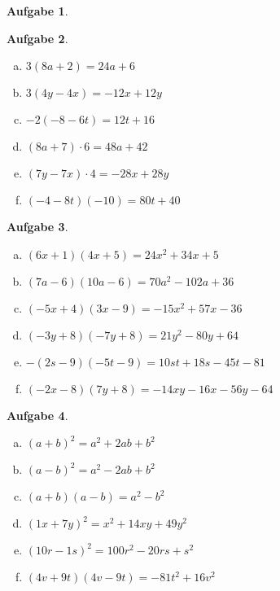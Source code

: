 \documentclass[12pt,fleqn]{article}
\theoremstyle{aufg}
\newtheorem{aufgabe}{Aufgabe}
\theoremstyle{bsp}
\begin{document}
\begin{flushleft}
\begin{aufgabe}
\begin{multicols}{2}
\begin{enumerate}[a)]
\end{enumerate} 
\end{multicols} 
\end{aufgabe} 
\begin{aufgabe} ~ \\ 
\begin{multicols}{3} 
\begin{enumerate}[a)] 
\item 
$3(8a+2)=24 a + 6$
\item 
$3(4y-4x)=- 12 x + 12 y$
\item 
$-2(-8-6t)=12 t + 16$
\item 
$(8a+7)\cdot 6=48 a + 42$
\item 
$(7y-7x)\cdot 4=- 28 x + 28 y$
\item 
$(-4-8t)(-10)=80 t + 40$
\end{enumerate} 
\end{multicols} 
\end{aufgabe} 
\begin{aufgabe} ~ \\ 
\begin{multicols}{3} 
\begin{enumerate}[a)] 
\item 
$(6x+1)(4x+5)=24 x^{2} + 34 x + 5$
\item 
$(7a-6)(10a-6)=70 a^{2} - 102 a + 36$
\item 
$(-5x+4)(3x-9)=- 15 x^{2} + 57 x - 36$
\item 
$(-3y+8)(-7y+8)=21 y^{2} - 80 y + 64$
\item 
$-(2s-9)(-5t-9)=10 s t + 18 s - 45 t - 81$
\item 
$(-2x-8)(7y+8)=- 14 x y - 16 x - 56 y - 64$
\end{enumerate} 
\end{multicols} 
\end{aufgabe} 
\begin{aufgabe} ~ \\ 
\begin{multicols}{3} 
\begin{enumerate}[a)] 
\item 
$(a+b)^2=a^{2} + 2 a b + b^{2}$
\item 
$(a-b)^2=a^{2} - 2 a b + b^{2}$
\item 
$(a+b)(a-b)=a^{2} - b^{2}$
\item 
$(1x+7y)^2=x^{2} + 14 x y + 49 y^{2}$
\item 
$(10r-1s)^2=100 r^{2} - 20 r s + s^{2}$
\item 
$(4v+9t)(4v-9t)=- 81 t^{2} + 16 v^{2}$

\end{enumerate}
\end{multicols}
\end{aufgabe}
\end{flushleft}
\end{document}
